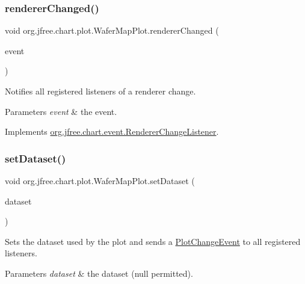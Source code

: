 \subsubsection{\texorpdfstring{renderer\+Changed()}{rendererChanged()}}
{\footnotesize\ttfamily void org.\+jfree.\+chart.\+plot.\+Wafer\+Map\+Plot.\+renderer\+Changed (\begin{DoxyParamCaption}\item[{\mbox{\hyperlink{classorg_1_1jfree_1_1chart_1_1event_1_1_renderer_change_event}{Renderer\+Change\+Event}}}]{event }\end{DoxyParamCaption})}

Notifies all registered listeners of a renderer change.


\begin{DoxyParams}{Parameters}
{\em event} & the event. \\
\hline
\end{DoxyParams}


Implements \mbox{\hyperlink{interfaceorg_1_1jfree_1_1chart_1_1event_1_1_renderer_change_listener_a1ad26540595e3f503db1803adcaad4e0}{org.\+jfree.\+chart.\+event.\+Renderer\+Change\+Listener}}.

\mbox{\label{classorg_1_1jfree_1_1chart_1_1plot_1_1_wafer_map_plot_a7017676e60e27f2673a012b80d15a20d}} 
\subsubsection{\texorpdfstring{set\+Dataset()}{setDataset()}}
{\footnotesize\ttfamily void org.\+jfree.\+chart.\+plot.\+Wafer\+Map\+Plot.\+set\+Dataset (\begin{DoxyParamCaption}\item[{\mbox{\hyperlink{classorg_1_1jfree_1_1data_1_1general_1_1_wafer_map_dataset}{Wafer\+Map\+Dataset}}}]{dataset }\end{DoxyParamCaption})}

Sets the dataset used by the plot and sends a \mbox{\hyperlink{}{Plot\+Change\+Event}} to all registered listeners.


\begin{DoxyParams}{Parameters}
{\em dataset} & the dataset ({\ttfamily null} permitted). \\
\hline
\end{DoxyParams}
\mbox{\label{classorg_1_1jfree_1_1chart_1_1plot_1_1_wafer_map_plot_a6b3fc137e64ac587f5393ede70e043da}} 
